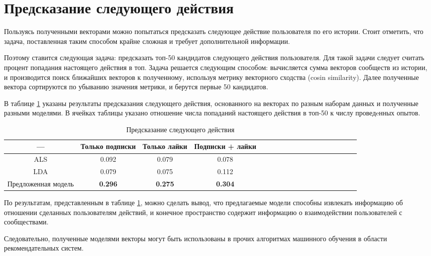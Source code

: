 \documentclass[times,specification,annotation]{itmo-student-thesis}
\begin{document}
\section{Предсказание следующего действия}\label{sec:next-action}
Пользуясь полученными векторами можно попытаться предсказать следующее действие пользователя по его истории. Стоит отметить, что задача, поставленная таким способом крайне сложная и требует дополнительной информации.

Поэтому ставится следующая задача: предсказать топ-50 кандидатов следующего действия пользователя. Для такой задачи следует считать процент попадания настоящего действия в топ. Задача решается следующим способом: вычисляется сумма векторов сообществ из истории, и производится поиск ближайших векторов к полученному, используя метрику векторного сходства (cosin similarity). Далее полученные вектора сортируются по убыванию значения метрики, и берутся первые 50 кандидатов.

В таблице \ref {tab2-next-action} указаны результаты предсказания следующего действия, основанного на векторах по разным наборам данных и полученные разными моделями. В ячейках таблицы указано отношение числа попаданий настоящего действия в топ-50 к числу проведeнных опытов.  

\begin{table}[!h]
\caption{Предсказание следующего действия} \label{tab2-next-action}
\centering
\begin{tabular}{|*{18}{c|}}\hline
---  & Только подписки  & Только лайки & Подписки + лайки \\\hline
ALS                        & 0.092 & 0.079  & 0.078 \\\hline
LDA                       & 0.079 & 0.075  & 0.112 \\\hline
Предложенная модель & \textbf{0.296} & \textbf{0.275} & \textbf{0.304} \\\hline
\end{tabular}
\end{table}

По результатам, представленным в таблице \ref{tab2-next-action}, можно сделать вывод, что предлагаемые модели способны извлекать информацию об отношении сделанных пользователям действий, и конечное пространство содержит информацию о взаимодействии пользователей с сообществами. 

Следовательно, полученные моделями векторы могут быть использованы в прочих алгоритмах машинного обучения в области рекомендательных систем.
\end{document}
